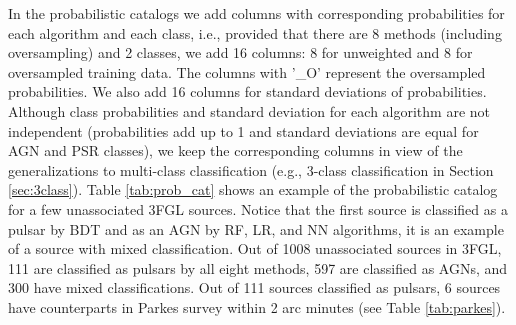 In the probabilistic catalogs we add columns with corresponding probabilities for each algorithm and each class,
i.e., provided that there are 8 methods (including oversampling) and 2 classes, we add 16 columns: 8 for unweighted and 8 for oversampled training data. The columns with '\_O' represent the oversampled probabilities. We also add 16 columns for standard deviations of probabilities. Although class probabilities and standard deviation for each algorithm are not independent (probabilities add up to 1 and standard deviations are equal for AGN and PSR classes), we keep the corresponding columns in view of the generalizations to multi-class classification (e.g., 3-class classification in Section \ref{sec:3class}).
Table \ref{tab:prob_cat} shows an example of the probabilistic catalog for a few unassociated 3FGL sources.
Notice that the first source is classified as a pulsar by BDT and as an AGN by RF, LR, and NN algorithms,
it is an example of a source with mixed classification.
Out of 1008 unassociated sources in 3FGL, 111 are classified as pulsars by all eight methods, 597 are classified as AGNs, and 300 have mixed classifications.
Out of 111 sources classified as pulsars, 6 sources have counterparts in Parkes survey \citep{Camilo2015} within 2 arc minutes (see Table \ref{tab:parkes}).

